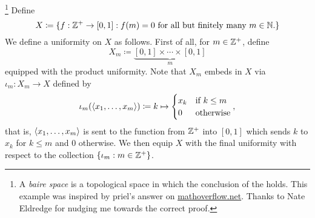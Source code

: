 \begin{exm}\begin{savenotes}\footnote{A \emph{baire space} is a topological space in which the conclusion of the  holds.  This example was inspired by priel's answer on \href{http://mathoverflow.net/questions/212308/baire-category-theorem-for-complete-uniform-spaces}{mathoverflow.net}.  Thanks to Nate Eldredge for nudging me towards the correct proof.}\label{exm4.5.2x}
Define
\begin{equation}
X\coloneqq \{ f:\mathbb{Z} ^+ \rightarrow [0,1] :f(m)=0\text{ for all but finitely many }m\in \mathbb{N} \text{.}\} 
\end{equation}
We define a uniformity on $X$ as follows.  First of all, for $m\in \mathbb{Z} ^+$, define
\begin{equation}
X_m\coloneqq \underbrace{[0,1] \times \cdots \times [0,1]}_{m}
\end{equation}
equipped with the product uniformity.  Note that $X_m$ embeds in $X$ via $\iota _m:X_m\rightarrow X$ defined by
\begin{equation}
\iota _m(\langle x_1,\ldots ,x_m\rangle)\coloneqq k\mapsto \begin{cases}x_k & \text{if }k\leq m \\ 0 & \text{otherwise}\end{cases},
\end{equation}
that is, $\langle x_1,\ldots ,x_m\rangle$ is sent to the function from $\mathbb{Z} ^+$ into $[0,1]$ which sends $k$ to $x_k$ for $k\leq m$ and $0$ otherwise.  We then equip $X$ with the final uniformity with respect to the collection $\{ \iota _m:m\in \mathbb{Z} ^+\}$.


\end{savenotes}
\end{exm}
